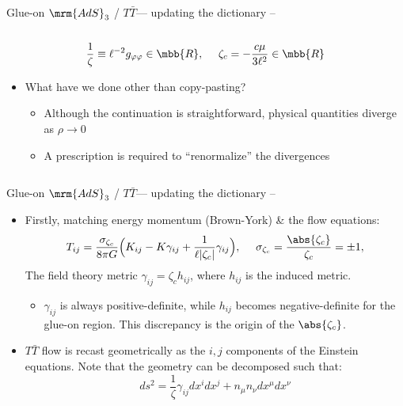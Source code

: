 \documentclass[
	10pt
	,noamsthm
]{beamer}
\newcommand{\TTbar}{\texorpdfstring{\ensuremath{T\bar{T}}}{TTbar}\xspace}
\begin{document}
\begin{frame}{Glue-on $\mrm{AdS}_3$ / \TTbar --- updating the dictionary}{%
	\textcite{Apolo:2023vnm} -- 
}
\begin{columns}
\figGlueon
\begin{column}{.64\textwidth}
\vspace{-\baselineskip}
\begin{equation}
	\frac{1}{\zeta} \equiv \ell^{-2} g_{\varphi\varphi} \in \mbb{R},
\ \quad
	\zeta_c = - \frac{c \mu}{3\ell^2} \in \mbb{R}
\end{equation}
\vspace{-.5\baselineskip}
\begin{itemize}
\item What have we done other than copy-pasting?
	\begin{itemize}
	\item Although the continuation is straightforward, physical quantities diverge as $\rho \to 0$
	
	\item A prescription is required to ``renormalize'' the divergences
	\end{itemize}
	
\end{itemize}
\end{column}
\end{columns}
\end{frame}

\begin{frame}{Glue-on $\mrm{AdS}_3$ / \TTbar --- updating the dictionary}{%
	\textcite{Kraus:2018xrn} -- 
}
\begin{itemize}
\item Firstly, matching energy momentum (Brown-York) \& the flow equations:
	\begin{equation}
		T_{ij}= \frac{\sigma_{\zeta_c}}{8\pi G} \Big( K_{ij} -  K \gamma_{ij} + \frac{1}{\ell |\zeta_c|}\gamma_{ij}\Big), \ \quad \sigma_{\zeta_c} = \frac{\abs{\zeta_c}}{\zeta_c} = \pm 1,
		\label{BYtensor}
	\end{equation}
	The field theory metric $\gamma_{ij} = \zeta_c h_{ij}$, where $h_{ij}$ is the induced metric.
	
	\pause
	
	\begin{itemize}
	\item $\gamma_{ij}$ is always positive-definite, while $h_{ij}$ becomes negative-definite for the glue-on region.
	This discrepancy is the origin of the $\abs{\zeta_c}$.
	\end{itemize}
	
	\pause
	
\item \TTbar flow is recast geometrically as the $i,j$ components of the Einstein equations. 
Note that the geometry can be decomposed such that:
	\begin{equation}
		ds^2 = \frac{1}{\zeta} \gamma_{ij}dx^i dx^j+n_\mu n_\nu dx^\mu dx^\nu
	\end{equation}
\end{itemize}
\end{frame}
\end{document}
